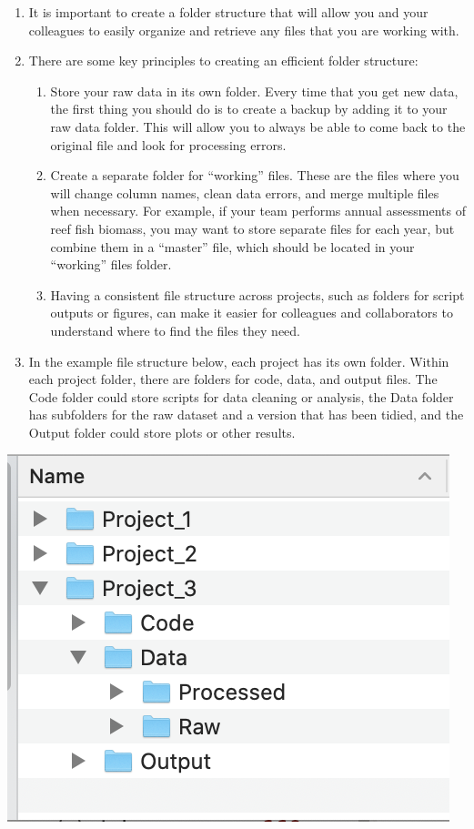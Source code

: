 \documentclass[
]{book}
\providecommand{\tightlist}{%
  \setlength{\itemsep}{0pt}\setlength{\parskip}{0pt}}
\begin{document}
\begin{enumerate}
\def\labelenumi{\arabic{enumi}.}
\item
  It is important to create a folder structure that will allow you and your colleagues to easily organize and retrieve any files that you are working with.
\item
  There are some key principles to creating an efficient folder structure:

  \begin{enumerate}
  \def\labelenumii{\arabic{enumii}.}
  \tightlist
  \item
    Store your raw data in its own folder. Every time that you get new data, the first thing you should do is to create a backup by adding it to your raw data folder. This will allow you to always be able to come back to the original file and look for processing errors.
  \item
    Create a separate folder for ``working'' files. These are the files where you will change column names, clean data errors, and merge multiple files when necessary. For example, if your team performs annual assessments of reef fish biomass, you may want to store separate files for each year, but combine them in a ``master'' file, which should be located in your ``working'' files folder.
  \item
    Having a consistent file structure across projects, such as folders for script outputs or figures, can make it easier for colleagues and collaborators to understand where to find the files they need.
  \end{enumerate}
\item
  In the example file structure below, each project has its own folder. Within each project folder, there are folders for code, data, and output files. The Code folder could store scripts for data cleaning or analysis, the Data folder has subfolders for the raw dataset and a version that has been tidied, and the Output folder could store plots or other results.
\end{enumerate}

\includegraphics{images/M2S1_example_file_structure.png}
\end{document}
